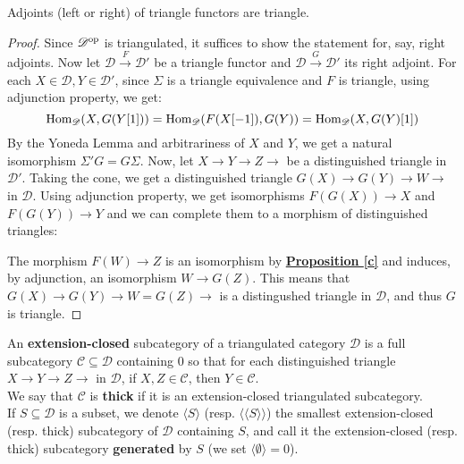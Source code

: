\begin{prop}\label{r}
Adjoints (left or right) of triangle functors are triangle. 
\end{prop}

\begin{proof}
  Since $\mathscr{D}^{\textnormal{op}}$ is triangulated, it suffices to show the statement for, say, right adjoints. Now let $\mathscr{D} \overset{F}{\longrightarrow} \mathscr{D}'$ be a triangle functor and $\mathscr{D} \overset{G}{\longrightarrow} \mathscr{D}'$ its right adjoint. For each $X \in \mathscr{D}, Y \in \mathscr{D}'$, since $\Sigma$ is a triangle equivalence and $F$ is triangle, using adjunction property, we get: $$\textnormal{Hom}_{\mathscr{D}}(X,G(Y[1]))=\textnormal{Hom}_{\mathscr{D}}(F(X[-1]),G(Y))=\textnormal{Hom}_{\mathscr{D}}(X,G(Y)[1])$$
  By the Yoneda Lemma and arbitrariness of $X$ and $Y$, we get a natural isomorphism $\Sigma' G = G \Sigma$. Now, let $X \longrightarrow Y \longrightarrow Z \longrightarrow$ be a distinguished triangle in $\mathscr{D}'$. Taking the cone, we get a distinguished triangle $G(X) \longrightarrow G(Y) \longrightarrow  W \longrightarrow$ in $\mathscr{D}$. Using adjunction property, we get isomorphisms  $F(G(X)) \longrightarrow X$ and $F(G(Y)) \longrightarrow Y$ and we can complete them to a morphism of distinguished triangles:
\begin{center}
\end{center}
The morphism $F(W) \longrightarrow Z$ is an isomorphism by \hyperref[c]{\textbf{Proposition \ref*{c}}} and induces, by adjunction, an isomorphism $W \longrightarrow G(Z)$. This means that $G(X) \longrightarrow G(Y) \longrightarrow W=G(Z) \longrightarrow$ is a distingushed triangle in $\mathscr{D}$, and thus $G$ is triangle. 
\end{proof}

\begin{defn} 
An \textbf{extension-closed} subcategory of a triangulated category $\mathscr{D}$ is a full subcategory $\mathscr{C} \subseteq \mathscr{D}$ containing $0$ so that for each distinguished triangle $X \longrightarrow Y \longrightarrow Z \longrightarrow $ in $\mathscr{D}$, if $X,Z \in \mathscr{C}$, then $Y \in \mathscr{C}$. \\
We say that $\mathscr{C}$ is \textbf{thick} if it is an extension-closed triangulated subcategory. \\  
If $S \subseteq \mathscr{D}$ is a subset, we denote $\langle S \rangle$ (resp. $\langle \langle S \rangle \rangle$) the smallest extension-closed (resp. thick) subcategory of $\mathscr{D}$ containing $S$, and call it the extension-closed (resp. thick) subcategory \textbf{generated} by $S$ (we set $\langle \emptyset \rangle = 0$). 
\end{defn}

